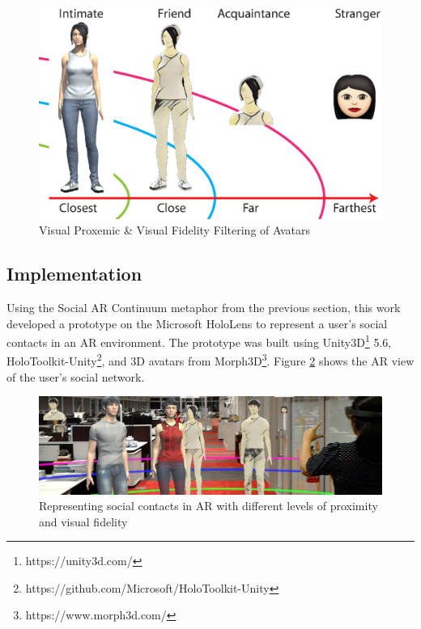 \begin{figure}[h]
  \centering
  \includegraphics[width=0.8\linewidth]{images/41-visualising-mgia17/writing-images-11.eps}
  \caption{Visual Proxemic \& Visual Fidelity Filtering of Avatars}
    \label{fig:contacts:proximic-circles}
\end{figure}



\subsection{Implementation}

Using the Social AR Continuum metaphor from the previous section, this work developed a prototype on the Microsoft HoloLens to represent a user's social contacts in an AR environment. The prototype was built using Unity3D\footnote{https://unity3d.com/} 5.6, HoloToolkit-Unity\footnote{https://github.com/Microsoft/HoloToolkit-Unity}, and 3D avatars from Morph3D\footnote{https://www.morph3d.com/}. Figure \ref{fig:contacts:overview} shows the AR view of the user's social network.

\begin{figure}[h]
  \includegraphics[width=\linewidth]{images/41-visualising-mgia17/20170618_031128_HoloLens_cropped.jpg}
  \caption{Representing social contacts in AR with different levels of proximity and visual fidelity}
  \label{fig:contacts:overview}
\end{figure}

